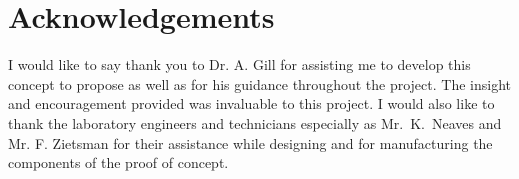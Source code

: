 \chapter*{Acknowledgements}
    I would like to say thank you to Dr. A. Gill for assisting me to develop this concept to propose as well as for his guidance throughout the project. The insight and encouragement provided was invaluable to this project. I would also like to thank the laboratory engineers and technicians especially as Mr.~K.~Neaves and Mr. F. Zietsman for their assistance while designing and for manufacturing the components of the proof of concept.


